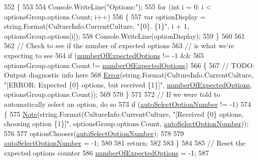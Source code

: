 \begin{DoxyCode}
552             \{
553 
554                 Console.WriteLine(\textcolor{stringliteral}{"Options:"});
555                 \textcolor{keywordflow}{for} (\textcolor{keywordtype}{int} i = 0; i < optionsGroup.options.Count; i++)
556                 \{
557                     var optionDisplay = string.Format(CultureInfo.CurrentCulture, \textcolor{stringliteral}{"\{0\}. \{1\}"}, i + 1, 
      optionsGroup.options[i]);
558                     Console.WriteLine(optionDisplay);
559                 \}
560 
561 
562                 \textcolor{comment}{// Check to see if the number of expected options}
563                 \textcolor{comment}{// is what we're expecting to see}
564                 \textcolor{keywordflow}{if} (\hyperlink{a00053_a2e17937195ecd64d5d867d958c45d2c3}{numberOfExpectedOptions} != -1 &&
565                     optionsGroup.options.Count != \hyperlink{a00053_a2e17937195ecd64d5d867d958c45d2c3}{numberOfExpectedOptions})
566                 \{
567                     \textcolor{comment}{// TODO: Output diagnostic info here}
568                     \hyperlink{a00172_a2f63f9f5b7634cb50ee75ff2eb18b137}{Error}(\textcolor{keywordtype}{string}.Format(CultureInfo.CurrentCulture, \textcolor{stringliteral}{"[ERROR: Expected \{0\} options, but
       received \{1\}]"}, \hyperlink{a00053_a2e17937195ecd64d5d867d958c45d2c3}{numberOfExpectedOptions}, optionsGroup.options.Count));
569 
570                 \}
571 
572                 \textcolor{comment}{// If we were told to automatically select an option, do so}
573                 \textcolor{keywordflow}{if} (\hyperlink{a00053_a34886671e91a1bf3fc225eeb67baced1}{autoSelectOptionNumber} != -1)
574                 \{
575                     \hyperlink{a00172_a939cc9e943c574b36c6af93e9c772702}{Note}(\textcolor{keywordtype}{string}.Format(CultureInfo.CurrentCulture, \textcolor{stringliteral}{"[Received \{0\} options, choosing
       option \{1\}]"}, optionsGroup.options.Count, \hyperlink{a00053_a34886671e91a1bf3fc225eeb67baced1}{autoSelectOptionNumber}));
576 
577                     optionChooser(\hyperlink{a00053_a34886671e91a1bf3fc225eeb67baced1}{autoSelectOptionNumber});
578 
579                     \hyperlink{a00053_a34886671e91a1bf3fc225eeb67baced1}{autoSelectOptionNumber} = -1;
580 
581                     \textcolor{keywordflow}{return};
582 
583                 \}
584 
585                 \textcolor{comment}{// Reset the expected options counter}
586                 \hyperlink{a00053_a2e17937195ecd64d5d867d958c45d2c3}{numberOfExpectedOptions} = -1;
587 

\end{DoxyCode}
